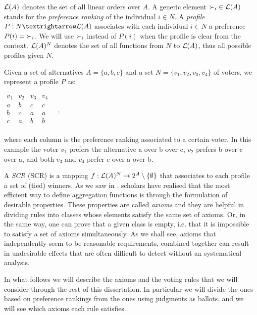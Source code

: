 $\mathcal{L}(A)$ denotes the set of all linear orders over $A$. A generic element $\mathbin{\prefi} \in \linors$ stands for the \textit{preference ranking} of the individual $i\in N$.
A \emph{profile} $\prof: N → \linors$ associates with each individual $i \in N$ a preference $\prof(i) =\mathbin{\prefi}$. We will use $\mathbin{\prefi}$ instead of $P(i)$ when the profile is clear from the context. $\mathcal{L}(A)^{N}$ denotes the set of all functions from $N$ to $\mathcal{L}(A)$, thus all possible profiles given $N$. 
\begin{example}
	\label{ex:namedprofile}
	Given a set of alternatives $A=\{a,b,c\}$ and a set $N=\{v_1,v_2,v_3,v_4\}$ of voters, we represent a profile $P$ as:
	\begin{center}
		$
		\begin{array}{cccc}
			v_1 & v_2 & v_3 & v_4\\
			a &	b & c & c \\
			b &	c & a & a \\
			c &	a & b & b \\
		\end{array} \quad, 
		$
	\end{center}
	where each column is the preference ranking associated to a certain voter. In this example the voter $v_1$ prefers the alternative a over b over c, $v_2$ prefers b over c over a, and both $v_3$ and $v_4$ prefer c over a over b.
\end{example}

A \emph{\acl{SCR}} (\acs{SCR}) is a mapping $f:\mathcal{L}(A)^{N}\rightarrow 2^{A} \setminus \{\emptyset \}$ that associates to each profile a set of (tied) winners. 
As we saw in , scholars have realised that the most efficient way to define aggregation functions is through the formulation of desirable properties.
These properties are called \textit{axioms} and they are helpful in dividing rules into classes whose elements satisfy the same set of axioms.
Or, in the same way, one can prove that a given class is empty, i.e. that it is impossible to satisfy a set of axioms simultaneously.
As we shall see, axioms that independently seem to be reasonable requirements, combined together can result in undesirable effects that are often difficult to detect without an systematical analysis.

In what follows we will describe the axioms and the voting rules that we will consider through the rest of this dissertation. In particular we will divide the ones based on preference rankings from the ones using judgments as ballots, and we will see which axioms each rule satisfies.

